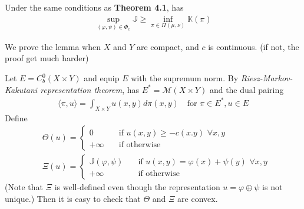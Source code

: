 \documentclass[12pt,a4paper]{article}
\newenvironment{proof}
{\begin{changemargin}{1cm}{0.5cm} 
	}%
	{\end{changemargin}
}
\newenvironment{p}
{\begin{proof} 
	}%
	{\end{proof}
}
\begin{document}
 Under the same conditions as \textbf{Theorem 4.1}, has
\begin{align*}
\sup_{(\varphi, \psi)\in \Phi_c} \mathbb{J} \geq \inf_{\pi \in \Pi(\mu, \nu)} \mathbb{K}(\pi) 
\end{align*}
\begin{p}
\pf We prove the lemma when $X$ and $Y$ are compact, and $c$ is continuous. (if not, the proof get much harder)

Let $E= C_b^0 (X\times Y)$ and equip $E$ with the supremum norm. By \emph{Riesz-Markov-Kakutani representation theorem}, has $E^* = \mathscr{M}(X\times Y)$ and the dual pairing
\begin{align*}
\langle \pi, u \rangle = \int_{X\times Y} u(x,y) d\pi(x,y) \quad \text{for } \pi \in E^*, u\in E
\end{align*}
Define
\begin{align*}
& \Theta(u) = \begin{cases}
0 \quad & \text{if } u(x,y) \geq -c(x.y) \,\, \forall x,y\\
+\infty \quad & \text{if otherwise}
\end{cases} \\
& \Xi(u) = \begin{cases}
\mathbb{J}(\varphi, \psi) \quad & \text{if } u(x,y) =\varphi(x) + \psi(y) \,\, \forall x,y\\
+\infty \quad & \text{if otherwise}
\end{cases}
\end{align*}
(Note that $\Xi$ is well-defined even though the representation $u = \varphi \oplus \psi$ is not unique.) Then it is easy to check that $\Theta$ and $\Xi$ are convex.


\end{p}
\end{document}
